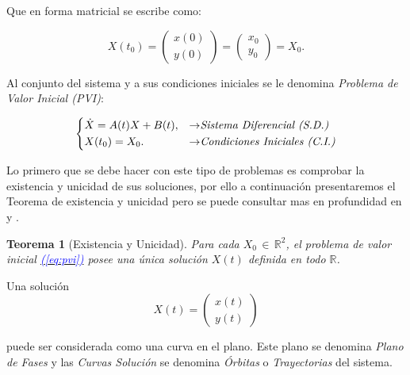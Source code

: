 \documentclass[12pt,a4paper]{report} %
\newtheorem{theorem}{Teorema}[chapter]
\newcommand{\eref}[1]{\hyperref[#1]{\textcolor{blue}{(\ref*{#1})}}}
\begin{document}
	\noindent Que en forma matricial se escribe como:
	
	\begin{equation}
		\label{cimat}
		X(t_0)=\begin{pmatrix}
			x(0)\\y(0)
		\end{pmatrix}=\begin{pmatrix}
		x_0\\y_0
		\end{pmatrix}=X_0.
	\end{equation}\smallskip
	
	\vspace{0.5cm}\noindent Al conjunto del sistema y a sus condiciones iniciales se le denomina \textit{Problema de Valor Inicial (PVI)}: 
	
	\begin{equation}
	\label{eq:pvi}
	\scalebox{1}{$\displaystyle
		\left\{
		\begin{aligned}
			&\dot{X}=A(t)X+B(t), &\rightarrow& \textit{Sistema Diferencial (S.D.)}\\
			&X(t_0)=X_0. &\rightarrow& \textit{Condiciones Iniciales (C.I.)}
		\end{aligned}
		\right.
		$}
    \end{equation}\smallskip
	
	\vspace{0.5cm} Lo primero que se debe hacer con este tipo de problemas es comprobar la existencia y unicidad de sus soluciones, por ello a continuación presentaremos el Teorema de existencia y unicidad pero se puede consultar mas en profundidad en \cite{perko} y \cite{simmons}.
	
	\begin{theorem}[Existencia y Unicidad]
		\label{thm:interesante}
		Para cada $X_0 \, \in \, \mathbb{R}^2$, el problema de valor inicial \eref{eq:pvi} posee una única solución $X(t)$ definida en todo $\mathbb{R}$.
	\end{theorem}
	\vspace{4mm}
	
	\noindent Una solución
	\begin{equation}
		\label{eq:puntos}
		X(t)=\begin{pmatrix}
			x(t) \\ y(t)
		\end{pmatrix}
	\end{equation}\smallskip
	
	\noindent puede ser considerada como una curva en el plano. Este plano se denomina \textit{Plano de Fases} y las \textit{Curvas Solución} se denomina \textit{Órbitas} o \textit{Trayectorias} del sistema.
	
\end{document}
